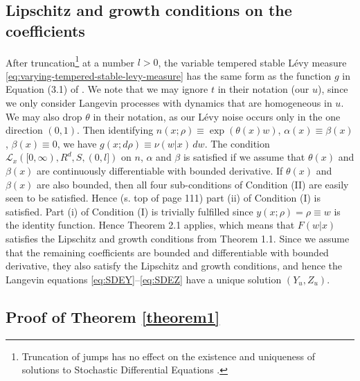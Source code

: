 \documentclass[a4paper,12pt]{elsarticle}
\numberwithin{equation}{section}
\theoremstyle{plain}
\theoremstyle{definition}
\theoremstyle{remark}
\numberwithin{equation}{section}
\newcommand{\1}{\mathbf 1}
\begin{document}
\subsection{Lipschitz and growth conditions on the coefficients} 
\label{subsec:Lip-gro}
After truncation\footnote{Truncation of jumps has no effect on the existence and 
uniqueness of solutions to Stochastic Differential Equations \cite{Applebaum}.} 
at a number $l > 0$, the variable tempered stable L\'evy 
measure 
\eqref{eq:varying-tempered-stable-levy-measure}
has the same form as the function $g$ in Equation (3.1) of 
\cite{Tsuchiya1992}.  
We note that we may ignore $t$ in their notation (our $u$), since we only 
consider Langevin processes with dynamics that are homogeneous in $u$.
We may also drop $\theta$ in their notation, as our L\'evy noise occurs only 
in the one direction $(0,1)$. 
Then identifying $n(x;\rho) \equiv \exp(\theta(x) w)$, 
$\alpha(x) \equiv \beta(x)$, $\beta(x) \equiv 0$, 
we have $g(x;d\rho) \equiv \nu(w|x)\,dw$. 
The condition $\mathcal L_x([0,\infty), R^d, S, (0,l])$ on $n$, $\alpha$ and 
$\beta$ is satisfied if we assume that $\theta(x)$ and $\beta(x)$ are 
continuously differentiable with bounded derivative. 
If $\theta(x)$ and $\beta(x)$ are also bounded, then all four sub-conditions of 
Condition (II) are easily seen to be satisfied.  
Hence (s. top of page 111) part (ii) of Condition (I) is satisfied. 
Part (i) of Condition (I) is trivially fulfilled since 
$y(x; \rho) = \rho \equiv w$ is the identity function. 
Hence Theorem 2.1 applies, which means that $F(w|x)$ satisfies the Lipschitz 
and growth conditions from Theorem 1.1. 
Since we assume that the remaining coefficients are bounded and differentiable 
with bounded derivative, they also satisfy the Lipschitz and growth conditions, 
and hence the Langevin equations \eqref{eq:SDEY}--\eqref{eq:SDEZ} have a unique 
solution $(Y_u, Z_u)$.


\subsection{Proof of Theorem \ref{theorem1}}
\label{sec:app-pf-th}
\end{document}
